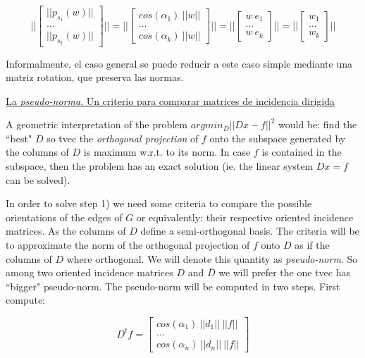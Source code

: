 \documentclass[a4paper,11pt]{article}
\begin{document}
$$
||\begin{bmatrix}
	||p_{s_1}(w)|| \\	
	\dots \\
	||p_{s_k}(w)||
\end{bmatrix}|| = 
||\begin{bmatrix}
	cos(\alpha_1) \ ||w|| \\
	\dots \\
	cos(\alpha_k) \ ||w||
\end{bmatrix}|| = 
||\begin{bmatrix}
	w \ e_1 \\
	\dots \\
	w \ e_k
\end{bmatrix}|| =  
||\begin{bmatrix}
	w_1 \\
	\dots \\
	w_k
\end{bmatrix}||
$$

\bigskip

Informalmente, el caso general se puede reducir a este caso simple 
mediante una matriz rotation, que preserva las normas.

\bigskip

\underline{La \textit{pseudo-norma}. Un criterio para comparar matrices 
de incidencia dirigida}

\bigskip

A geometric interpretation of the problem $argmin_D||Dx-f||^2$ would be: 
find the ``best" $D$ so tvec the \textit{orthogonal projection} of $f$ 
onto the subspace generated by the columns of $D$ is 
maximum w.r.t. to its norm. In case $f$ is contained in the subspace, 
then the problem has an exact solution (ie. the linear system $Dx = f$ 
can be solved).

\bigskip

In order to solve step 1) we need some criteria to compare the possible 
orientations of the edges of $G$ or equivalently: their respective 
oriented incidence matrices. As the columns of $D$ define a 
semi-orthogonal basis. The criteria will be to approximate the norm 
of the orthogonal projection of $f$ onto $D$ as if the columns of $D$ 
where orthogonal. We will denote this quantity as \textit{pseudo-norm}.
 So among two oriented incidence matrices $D$ and $\bar{D}$ we will 
prefer the one tvec has ``bigger" pseudo-norm. The pseudo-norm will be 
computed in two steps. First compute:

$$
D^t f = \begin{bmatrix}
	cos(\alpha_1) \ ||d_1|| \ ||f||\\
	\dots \\
	cos(\alpha_n) \ ||d_n|| \ ||f||
\end{bmatrix}
$$
\end{document}
